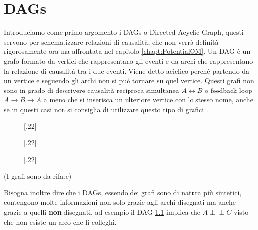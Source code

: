 \chapter{DAGs}
\label{chapt:DAGs}

Introduciamo come primo argomento i DAGs o Directed Acyclic Graph, questi servono per schematizzare relazioni di causalità, che non verrà  
definità rigorosamente ora ma affrontata nel capitolo \ref{chapt:PotentialOM}.
Un DAG è un grafo formato da vertici che rappresentano gli eventi e da archi che rappresentano la relazione di causalità tra i due eventi. Viene detto aciclico perché partendo da un vertice e seguendo gli archi non si può tornare su  quel vertice. Questi grafi non sono in grado di descrivere causalità reciproca simultanea $A \leftrightarrow B $  o feedback loop $A \rightarrow B \rightarrow A$ a meno che si inserisca un ulteriore vertice con lo stesso nome, anche se in questi casi non si consiglia di utilizzare questo tipo di grafici
\citep{cunningham2021causal}.

\begin{figure}[ht]
  [.22\linewidth]{%
  }%
  [.22\linewidth]{%
  }
  [.22\linewidth]{%
  }%
	\label{validDAG}

\end{figure}
(I grafi sono da rifare)

Bisogna inoltre dire che i DAGs, essendo dei grafi sono di natura più sintetici, contengono molte informazioni non solo grazie agli archi disegnati ma anche grazie a quelli \textbf{non} disegnati, ad esempio il DAG \ref{validDAG} implica che $A \perp\!\!\!\perp C$ visto che non esiste un arco che li colleghi. 

